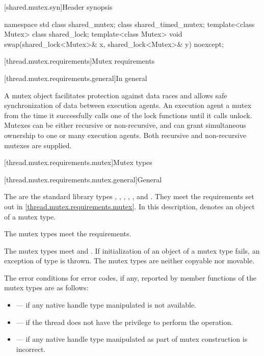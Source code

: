 [shared.mutex.syn]{Header  synopsis}

%
\begin{codeblock}
namespace std {
  class shared_mutex;
  class shared_timed_mutex;
  template<class Mutex> class shared_lock;
  template<class Mutex>
    void swap(shared_lock<Mutex>& x, shared_lock<Mutex>& y) noexcept;
}
\end{codeblock}

[thread.mutex.requirements]{Mutex requirements}

[thread.mutex.requirements.general]{In general}

\pnum
A mutex object facilitates protection against data races and allows safe synchronization of
data between execution agents.
An execution agent  a mutex from the time it successfully calls one of the
lock functions until it calls unlock. Mutexes can be either recursive or non-recursive, and can
grant simultaneous ownership to one or many execution agents. Both
recursive and non-recursive mutexes are supplied.

[thread.mutex.requirements.mutex]{Mutex types}

[thread.mutex.requirements.mutex.general]{General}

\pnum
The  are the standard library types ,
, , ,
, and .
They meet the requirements set out in \ref{thread.mutex.requirements.mutex}.
In this description,  denotes an object of a mutex type.
\begin{note}
The mutex types meet the  requirements.
\end{note}

\pnum
The mutex types meet  and .
If initialization of an object of a mutex type fails,
an exception of type  is thrown.
The mutex types are neither copyable nor movable.

\pnum
The error conditions for error codes, if any, reported by member functions of the mutex types
are as follows:
\begin{itemize}
\item {} --- if any native handle type manipulated is not available.
\item {} --- if the thread does not have the
privilege to perform the operation.
\item {} --- if any native handle type manipulated as part of mutex
construction is incorrect.
\end{itemize}

